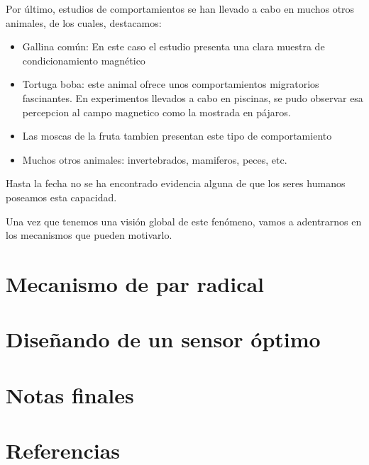 \documentclass[1p]{elsarticle}
\begin{document}
Por último, estudios de comportamientos se han llevado a cabo en muchos otros animales, de los cuales, destacamos: 
\begin{itemize}
	\item Gallina común: En este caso el estudio presenta una clara muestra de condicionamiento magnético
	\item Tortuga boba: este animal ofrece unos comportamientos migratorios fascinantes. En experimentos llevados a cabo en piscinas, se pudo observar esa percepcion al campo magnetico como la mostrada en pájaros.
	\item Las moscas de la fruta tambien presentan este tipo de comportamiento
	\item Muchos otros animales: invertebrados, mamiferos, peces, etc.
\end{itemize}

Hasta la fecha no se ha encontrado evidencia alguna de que los seres humanos poseamos esta capacidad.

Una vez que tenemos una visión global de este fenómeno, vamos a adentrarnos en los mecanismos que pueden motivarlo.


\section{Mecanismo de par radical}

\section{Diseñando de un sensor óptimo}



\section{Notas finales}


\section*{Referencias}


\end{document}

